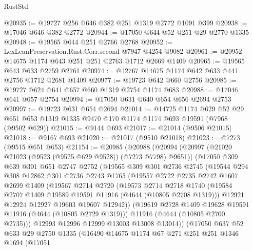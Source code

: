\begin{lexlean}{RustStd}
\begin{coremodule}
@20935 := @19727 @256 @646 @382 @251 @1319 @2772 @1091 @399
@20938 := @17046 @646 @382 @2772
@20944 := @17050 @644 @52 @251 @29 @2770 @1335
@20948 := @19565 @644 @251 @2766 @2768
@20952 := LexLeanPreservation.Rust.Corr.second @7947 @4254 @9082
@20961 := @20952 @14675 @1174 @643 @251 @251 @2763 @1712 @2669 @1409
@20965 := @19565 @643 @633 @2759 @2761
@20974 := @12767 @14675 @1174 @642 @633 @441 @2756 @1712 @2681 @1409
@20977 := @19723 @642 @660 @2756
@20985 := @19727 @624 @641 @657 @660 @1319 @2754 @1174 @683
@20988 := @17046 @641 @657 @2754
@20994 := @17050 @631 @640 @654 @656 @2694 @2753
@20997 := @19723 @631 @654 @2694
@21014 := @14725
    @1174
    @629
    @52
    @29
    @651
    @653
    @1319
    @1335
    @9470
    @170
    @1174
    @1174
    @693
    @19591
    (@7968 (@9502 @629))
@21015 := @9144 @693
@21017 := @21014 (@9506 @21015)
@21018 := @9167 @693
@21020 := @21017 (@9510 @21018)
@21023 := @7273 (@9515 @651 @653)
@21154 := @20985
    (@20988
      (@20994
        (@20997 (@21020 @21023 (@9523 (@9525 @629 @9528)) (@7273 @7798) @9651))
        (@17050
          @309
          @639
          @301
          @651
          @2747
          @2752
          (@19565
            @309
            @301
            @2736
            @2745
            (@19544
              @294
              @308
              @12862
              @301
              @2736
              @2743
              @1765
              (@19557
                @2722
                @2735
                @2742
                @1607
                @2699
                @1409
                (@19567
                  @2714
                  @2720
                  (@19573
                    @2714
                    @2718
                    @1740
                    (@19584 @2707 @1409 @19589 @19591 @11916 (@4644 (@10805 @2708 @1319)))
                    @12921
                    @12924
                    @12927
                    @19603
                    @19607
                    @12942))
                (@19619 @2728 @1409 @19628 @19591 @11916 (@4644 (@10805 @2729 @1319)))
                @11916
                (@4644 (@10805 @2700 @2735)))
              @12993
              @12996
              @12999
              @13003
              @13008
              @13014))
          (@17050
            @637
            @52
            @633
            @29
            @2750
            @1335
            (@16490
              @14675
              @1174
              @67
              @271
              @251
              @251
              @1346
              @1694
              (@17051

\end{coremodule}
\end{lexlean}
